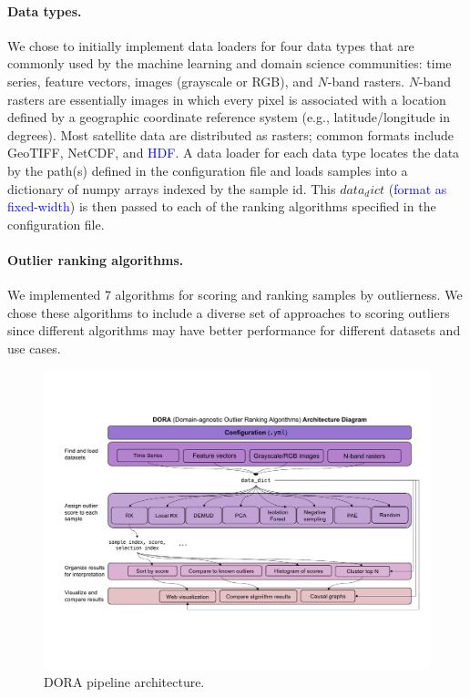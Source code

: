 \documentclass[letterpaper]{article} %
\newcommand{\todo}[1]{\textcolor{blue}{#1}}
\begin{document}
\paragraph{Data types.} We chose to initially implement data loaders for four
data types that are commonly used by the machine learning and domain science
communities: time series, feature vectors, images (grayscale or RGB), and 
$N$-band rasters. $N$-band rasters are essentially images in which every pixel
is associated with a location defined by a geographic coordinate reference 
system (e.g., latitude/longitude in degrees). Most satellite data are 
distributed as rasters; common formats include GeoTIFF, NetCDF, and 
\todo{HDF}. A data loader for each data type locates the data by the path(s)
defined in the configuration file and loads samples into a dictionary of numpy
 arrays indexed by the sample id. This $data_dict$ (\todo{format as 
 fixed-width}) is then passed to each of the ranking algorithms specified in 
 the configuration file.

\paragraph{Outlier ranking algorithms.} We implemented 7 algorithms for 
scoring and 
ranking samples by outlierness. We chose these algorithms to include a diverse
set of approaches to scoring outliers since different algorithms may have 
better performance for different datasets and use cases. 

\begin{figure}
    \centering
    \includegraphics[width=\linewidth]{figures/dora-system-diagram-v5.pdf}
    \caption{DORA pipeline architecture.}
    \label{fig:dora}
\end{figure}
\end{document}
